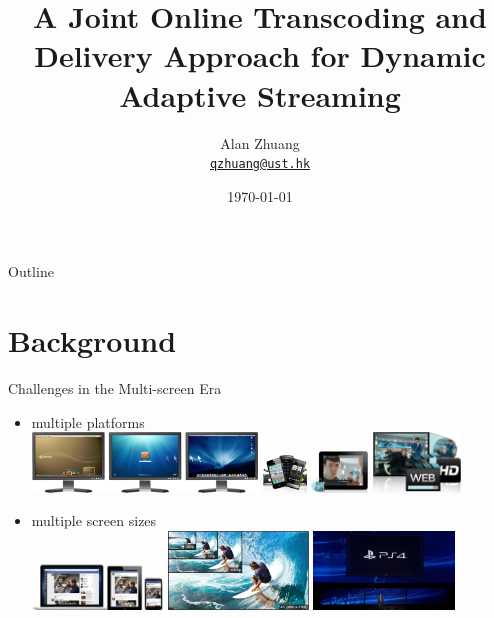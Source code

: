 \documentclass{beamer}
\title{A Joint Online Transcoding and Delivery Approach for Dynamic Adaptive Streaming}
\author{Alan Zhuang\\
\href{mailto:qzhuang@ust.hk}{\nolinkurl{qzhuang@ust.hk}}\\
}
\date{\today}
\begin{document}


\frame{\titlepage}

\section[Outline]{}
\begin{frame}{Outline}
  \tableofcontents
\end{frame}

\section{Background}

\begin{frame}{Challenges in the Multi-screen Era}
	\begin{itemize}
		\item<1> multiple platforms \\ %
		\includegraphics[height=1.6cm]{fig/PCs.png}
		\includegraphics[height=1.0cm]{fig/mobile-bc.png}
		\includegraphics[height=1.1cm]{fig/streaming-bc.png}
		\includegraphics[height=1.6cm]{fig/video_quality-bc.png} 
		\item<1> multiple screen sizes \\ %
		\includegraphics[height=1.3cm]{fig/screen_sizes.jpg}
		\includegraphics[height=2.1cm]{fig/480_to_4KVideo.jpg}
		\includegraphics[height=2.1cm]{fig/4k_video.jpg} 
	\end{itemize}
\end{frame}
\end{document}
